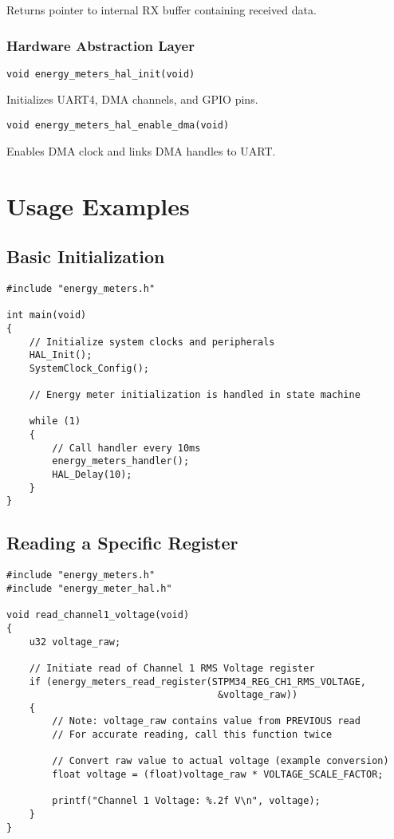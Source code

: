 \documentclass[11pt,a4paper]{article}
\begin{document}
Returns pointer to internal RX buffer containing received data.

\subsubsection{Hardware Abstraction Layer}

\texttt{void energy\_meters\_hal\_init(void)}

Initializes UART4, DMA channels, and GPIO pins.

\vspace{0.5em}

\texttt{void energy\_meters\_hal\_enable\_dma(void)}

Enables DMA clock and links DMA handles to UART.

\section{Usage Examples}

\subsection{Basic Initialization}

\begin{lstlisting}
#include "energy_meters.h"

int main(void)
{
    // Initialize system clocks and peripherals
    HAL_Init();
    SystemClock_Config();

    // Energy meter initialization is handled in state machine

    while (1)
    {
        // Call handler every 10ms
        energy_meters_handler();
        HAL_Delay(10);
    }
}
\end{lstlisting}

\subsection{Reading a Specific Register}

\begin{lstlisting}
#include "energy_meters.h"
#include "energy_meter_hal.h"

void read_channel1_voltage(void)
{
    u32 voltage_raw;

    // Initiate read of Channel 1 RMS Voltage register
    if (energy_meters_read_register(STPM34_REG_CH1_RMS_VOLTAGE,
                                     &voltage_raw))
    {
        // Note: voltage_raw contains value from PREVIOUS read
        // For accurate reading, call this function twice

        // Convert raw value to actual voltage (example conversion)
        float voltage = (float)voltage_raw * VOLTAGE_SCALE_FACTOR;

        printf("Channel 1 Voltage: %.2f V\n", voltage);
    }
}
\end{lstlisting}
\end{document}
